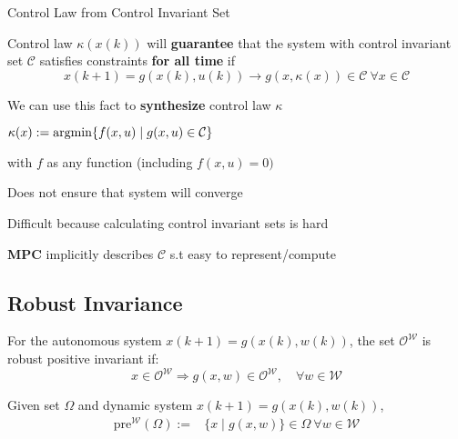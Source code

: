 \begin{sstTitleBox}[BrickRed]{
		Control Law from Control Invariant Set
	}

	\begin{sstOnlyFrame}[BrickRed]

		\begin{centering}
			Control law $\kappa(x(k))$ will \textbf{guarantee}
			that the system
			with control invariant set $\mathcal{C}$
			satisfies constraints \textbf{for all time} if
			$$x(k+1)=g(x(k),u(k))\to
				g(x,\kappa(x)) \in \mathcal{C} \ \forall x \in \mathcal{C}$$

			We can use this fact to \textbf{synthesize}
			control law $\kappa$

		\end{centering}
		\begin{sstFullFrame}[BrickRed]\color{white}
			\begin{centering}

				$\kappa(x):=\operatorname{argmin}\{f(x,u) \mid g(x,u)\in\mathcal{C}\}$

			\end{centering}
		\end{sstFullFrame}

		with $f$ as any function (including $f(x,u)=0)$
	\end{sstOnlyFrame}

	\begin{sstOnlyFrame}[BrickRed]
		Does not ensure that system will converge

		Difficult because calculating control invariant sets is hard

		\textbf{MPC} implicitly describes $\mathcal{C}$
		s.t easy to represent/compute
	\end{sstOnlyFrame}
\end{sstTitleBox}

\subsection{Robust Invariance}

\begin{definition}
	For the autonomous system
	$x(k+1)=g(x(k),w(k))$,
	the set $\mathcal{O}^\mathcal{W}$
	is robust positive invariant
	if:
	\[
		x\in\mathcal{O}^\mathcal{W}\Rightarrow
		g(x,w) \in \mathcal{O}^\mathcal{W},
		\quad \forall w \in \mathcal{W}
	\]
\end{definition}

Given set $\Omega$ and dynamic system $x(k+1) = g(x(k), w(k))$,
\begin{align*}
	\mathrm{pre}^{\mathcal{W}}(\Omega) := & \{x \mid g(x,w)\} \in \Omega \ \forall w \in \mathcal{W}
\end{align*}


